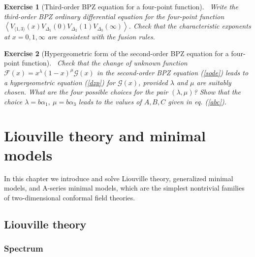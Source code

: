 \documentclass[12pt,a4paper,notitlepage]{report}
\newcommand \la {\left\langle}
\newcommand \ra {\right\rangle}
\numberwithin{equation}{section}
\theoremstyle{break}
\newtheorem{exo}{Exercise}[chapter]
\begin{document}
\begin{exo}[Third-order BPZ equation for a four-point function]
 ~\label{exotbf}
 Write the third-order BPZ ordinary differential equation for the four-point function $\la V_{\langle 1,3 \rangle}(x)V_{\Delta_1}(0)V_{\Delta_2}(1)V_{\Delta_3}(\infty)\ra $. Check that the characteristic exponents at $x=0,1,\infty$ are consistent with the fusion rules. 
\end{exo}


\begin{exo}[Hypergeometric form of the second-order BPZ equation for a four-point function]
 ~\label{exohge}
 Check that the change of unknown function $\mathcal{F}(x)=x^{\lambda}(1-x)^{\mu}\mathcal{G}(x)$ in the second-order BPZ equation (\ref{sode}) leads to a hypergeometric equation (\ref{dzp}) for $\mathcal{G}(x)$, provided $\lambda$ and $\mu$ are suitably chosen. What are the four possible choices for the pair $(\lambda,\mu)$?
Show that the choice $\lambda=b\alpha_1,\ \mu=b\alpha_3$ leads to the values of $A,B,C$ given in eq. (\ref{abc}). 
\end{exo}



\cleardoublepage

\chapter{Liouville theory and minimal models \label{seccbm}}

In this chapter we introduce and solve Liouville theory, generalized minimal models, and A-series minimal models, which are the simplest nontrivial families of two-dimensional conformal field theories. 

\section{Liouville theory \label{secliou}}

\subsection{Spectrum \label{secspe}}
\end{document}
